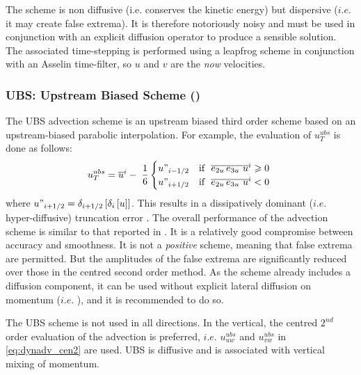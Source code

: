 \documentclass[../tex_main/NEMO_manual]{subfiles}
\begin{document}
The scheme is non diffusive (i.e. conserves the kinetic energy) but dispersive ($i.e.$ it may create false extrema).
It is therefore notoriously noisy and must be used in conjunction with an explicit diffusion operator to
produce a sensible solution.
The associated time-stepping is performed using a leapfrog scheme in conjunction with an Asselin time-filter,
so $u$ and $v$ are the \emph{now} velocities.

\subsubsection{UBS: Upstream Biased Scheme (\protect{})}
\label{subsec:DYN_adv_ubs}

The UBS advection scheme is an upstream biased third order scheme based on
an upstream-biased parabolic interpolation.
For example, the evaluation of $u_T^{ubs} $ is done as follows:
\begin{equation} \label{eq:dynadv_ubs}
u_T^{ubs} =\overline u ^i-\;\frac{1}{6} 	\begin{cases}
		u"_{i-1/2}& 	\text{if $\ \overline{e_{2u}\,e_{3u} \ u}^i  \geqslant 0$ } 	\\
		u"_{i+1/2}& 	\text{if $\ \overline{e_{2u}\,e_{3u} \ u}^i  < 0$ }
\end{cases}
\end{equation}
where $u"_{i+1/2} =\delta _{i+1/2} \left[ {\delta _i \left[ u \right]} \right]$.
This results in a dissipatively dominant ($i.e.$ hyper-diffusive) truncation error
\citep{Shchepetkin_McWilliams_OM05}.
The overall performance of the advection scheme is similar to that reported in \citet{Farrow1995}.
It is a relatively good compromise between accuracy and smoothness.
It is not a \emph{positive} scheme, meaning that false extrema are permitted.
But the amplitudes of the false extrema are significantly reduced over those in the centred second order method.
As the scheme already includes a diffusion component, it can be used without explicit lateral diffusion on momentum 
($i.e.$ \forcode{ = }),
and it is recommended to do so.

The UBS scheme is not used in all directions.
In the vertical, the centred $2^{nd}$ order evaluation of the advection is preferred, $i.e.$ $u_{uw}^{ubs}$ and
$u_{vw}^{ubs}$ in \autoref{eq:dynadv_cen2} are used.
UBS is diffusive and is associated with vertical mixing of momentum. 
\end{document}
